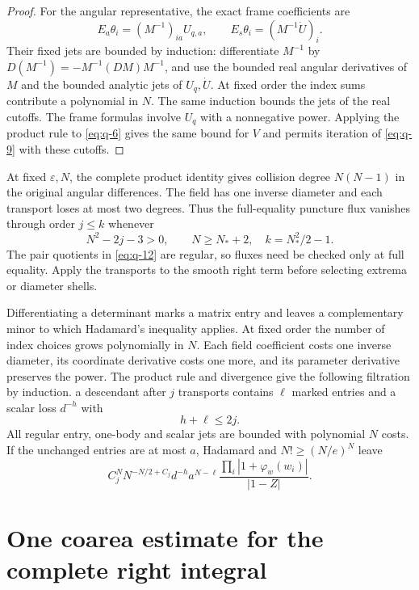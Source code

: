 \documentclass[11pt]{article}
\numberwithin{equation}{section}
\theoremstyle{remark}\newtheorem{remark}[theorem]{Remark}
\begin{document}
\begin{proof}
For the angular representative, the exact frame coefficients are
\[
 E_a\theta_i=(M^{-1})_{ia}U_{q,a},\qquad
 E_s\theta_i=(M^{-1}\dot U)_i.
\]
Their fixed jets are bounded by induction: differentiate
$M^{-1}$ by $D(M^{-1})=-M^{-1}(DM)M^{-1}$, and use the bounded
real angular derivatives of $M$ and the bounded analytic jets
of $U_q,\dot U$. At fixed order the index sums contribute a
polynomial in $N$. The same induction bounds the jets of the real
cutoffs. The frame formulas involve $U_q$ with a nonnegative power.
Applying the product rule to \eqref{eq:q-6} gives the same bound for $V$
and permits iteration of \eqref{eq:q-9} with these cutoffs.
\end{proof}

At fixed $\varepsilon,N$, the complete product identity gives
collision degree $N(N-1)$ in the original angular differences.
The field has one inverse diameter and each transport loses at most
two degrees. Thus the full-equality puncture flux vanishes through
order $j\le k$ whenever
\begin{equation}\label{eq:q-18}
N^2-2j-3>0,\qquad N\ge N_*+2,\quad k=N_*^2/2-1.
\end{equation}
The pair quotients in \eqref{eq:q-12} are regular, so fluxes need be
checked only at full equality. Apply the transports to the smooth right
term before selecting extrema or diameter shells.

Differentiating a determinant marks a matrix entry and leaves a
complementary minor to which Hadamard's inequality applies. At fixed
order the number of index choices grows polynomially in $N$. Each field
coefficient costs one inverse diameter, its coordinate derivative
costs one more, and its parameter derivative preserves the power.
The product rule and divergence give the following filtration by
induction.
a descendant after $j$ transports contains $\ell$ marked entries and
a scalar loss $d^{-h}$ with
\begin{equation}\label{eq:q-19}
h+\ell\le2j.
\end{equation}
All regular entry, one-body and scalar jets are bounded with
polynomial $N$ costs. If the unchanged entries are at most $a$,
Hadamard and $N!\ge(N/e)^N$ leave
\begin{equation}\label{eq:q-20}
C_j^N N^{-N/2+C_j}d^{-h}a^{N-\ell}
 \frac{\prod_i|1+\varphi_w(w_i)|}{|1-Z|}.
\end{equation}

\section{One coarea estimate for the complete right integral}\label{sec:global-integration}
\end{document}
